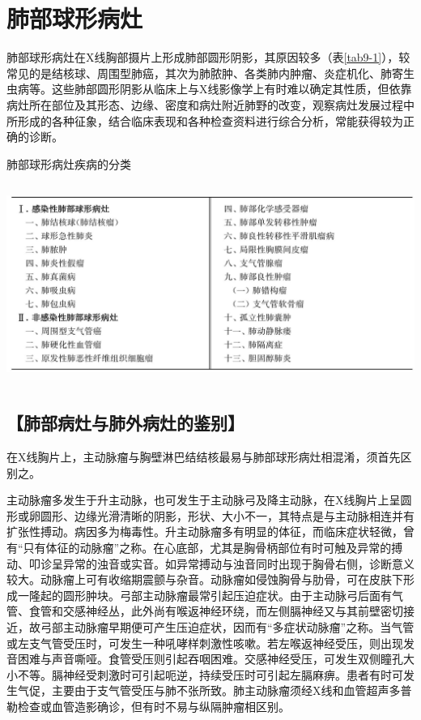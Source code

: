 \chapter{肺部球形病灶}

肺部球形病灶在X线胸部摄片上形成肺部圆形阴影，其原因较多（表\ref{tab9-1}），较常见的是结核球、周围型肺癌，其次为肺脓肿、各类肺内肿瘤、炎症机化、肺寄生虫病等。这些肺部圆形阴影从临床上与X线影像学上有时难以确定其性质，但依靠病灶所在部位及其形态、边缘、密度和病灶附近肺野的改变，观察病灶发展过程中所形成的各种征象，结合临床表现和各种检查资料进行综合分析，常能获得较为正确的诊断。

\begin{table}[htbp]
\centering
\caption{肺部球形病灶疾病的分类}
\label{tab9-1}
\includegraphics[width=5.91667in,height=2.57292in]{./images/Image00065.jpg}
\end{table}

\section{【肺部病灶与肺外病灶的鉴别】}

在X线胸片上，主动脉瘤与胸壁淋巴结结核最易与肺部球形病灶相混淆，须首先区别之。

主动脉瘤多发生于升主动脉，也可发生于主动脉弓及降主动脉，在X线胸片上呈圆形或卵圆形、边缘光滑清晰的阴影，形状、大小不一，其特点是与主动脉相连并有扩张性搏动。病因多为梅毒性。升主动脉瘤多有明显的体征，而临床症状轻微，曾有“只有体征的动脉瘤”之称。在心底部，尤其是胸骨柄部位有时可触及异常的搏动、叩诊呈异常的浊音或实音。如异常搏动与浊音同时出现于胸骨右侧，诊断意义较大。动脉瘤上可有收缩期震颤与杂音。动脉瘤如侵蚀胸骨与肋骨，可在皮肤下形成一隆起的圆形肿块。弓部主动脉瘤最常引起压迫症状。由于主动脉弓后面有气管、食管和交感神经丛，此外尚有喉返神经环绕，而左侧膈神经又与其前壁密切接近，故弓部主动脉瘤早期便可产生压迫症状，因而有“多症状动脉瘤”之称。当气管或左支气管受压时，可发生一种吼哮样刺激性咳嗽。若左喉返神经受压，则出现发音困难与声音嘶哑。食管受压则引起吞咽困难。交感神经受压，可发生双侧瞳孔大小不等。膈神经受刺激时可引起呃逆，持续受压时可引起左膈麻痹。患者有时可发生气促，主要由于支气管受压与肺不张所致。肺主动脉瘤须经X线和血管超声多普勒检查或血管造影确诊，但有时不易与纵隔肿瘤相区别。

